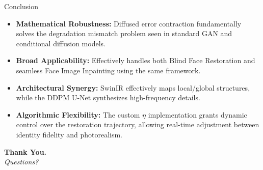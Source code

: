 \documentclass[aspectratio=169]{beamer}
\begin{document}
\begin{frame}{Conclusion}
    \begin{itemize}
        \item \textbf{Mathematical Robustness:} Diffused error contraction fundamentally solves the degradation mismatch problem seen in standard GAN and conditional diffusion models.
        \item \textbf{Broad Applicability:} Effectively handles both Blind Face Restoration and seamless Face Image Inpainting using the same framework.
        \item \textbf{Architectural Synergy:} SwinIR effectively maps local/global structures, while the DDPM U-Net synthesizes high-frequency details.
        \item \textbf{Algorithmic Flexibility:} The custom $\eta$ implementation grants dynamic control over the restoration trajectory, allowing real-time adjustment between identity fidelity and photorealism.
    \end{itemize}
    
    \vspace{0.5cm}
    \begin{center}
        \textbf{Thank You.} \\
        \textit{Questions?}
    \end{center}
\end{frame}
\end{document}
